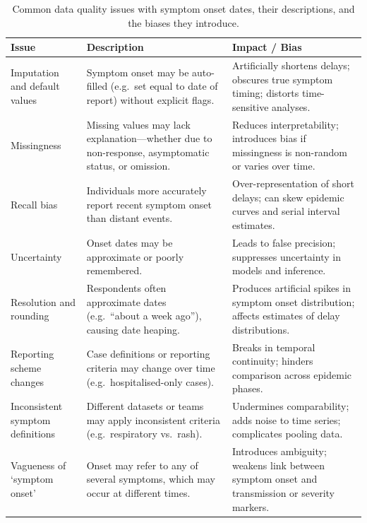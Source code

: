 \documentclass[11pt,a4paper]{article}
\begin{document}
\begin{table}[ht]
  \centering
  \caption{Common data quality issues with symptom onset dates, their descriptions, and the biases they introduce.}
  \label{tab:onset-issues}
  \begin{tabular}{p{3.5cm} p{5cm} p{5.5cm}}
    \toprule
    Issue & Description & Impact / Bias \\
    \midrule
    Imputation and default values
      & Symptom onset may be auto-filled (e.g.\ set equal to date of report) without explicit flags.
      & Artificially shortens delays; obscures true symptom timing; distorts time-sensitive analyses. \\
    Missingness
      & Missing values may lack explanation---whether due to non-response, asymptomatic status, or omission.
      & Reduces interpretability; introduces bias if missingness is non-random or varies over time. \\
    Recall bias
      & Individuals more accurately report recent symptom onset than distant events.
      & Over-representation of short delays; can skew epidemic curves and serial interval estimates. \\
    Uncertainty
      & Onset dates may be approximate or poorly remembered.
      & Leads to false precision; suppresses uncertainty in models and inference. \\
    Resolution and rounding
      & Respondents often approximate dates (e.g.\ ``about a week ago''), causing date heaping.
      & Produces artificial spikes in symptom onset distribution; affects estimates of delay distributions. \\
    Reporting scheme changes
      & Case definitions or reporting criteria may change over time (e.g.\ hospitalised-only cases).
      & Breaks in temporal continuity; hinders comparison across epidemic phases. \\
    Inconsistent symptom definitions
      & Different datasets or teams may apply inconsistent criteria (e.g.\ respiratory vs.\ rash).
      & Undermines comparability; adds noise to time series; complicates pooling data. \\
    Vagueness of `symptom onset'
      & Onset may refer to any of several symptoms, which may occur at different times.
      & Introduces ambiguity; weakens link between symptom onset and transmission or severity markers. \\
    \bottomrule
  \end{tabular}
\end{table}
\end{document}
